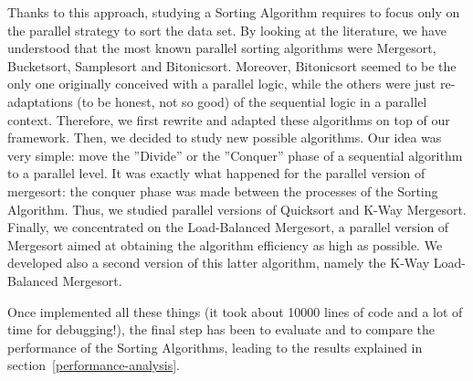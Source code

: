 Thanks to this approach, studying a Sorting Algorithm requires to focus only on the parallel strategy to sort the data set. By looking at the literature, we have understood that the most known parallel sorting algorithms were Mergesort, Bucketsort, Samplesort and Bitonicsort. Moreover, Bitonicsort seemed to be the only one originally conceived with a parallel logic, while the others were just re-adaptations (to be honest, not so good) of the sequential logic in a parallel context. Therefore, we first rewrite and adapted these algorithms on top of our framework. Then, we decided to study new possible algorithms. Our idea was very simple: move the ''Divide'' or the ''Conquer'' phase of a sequential algorithm to a parallel level. It was exactly what happened for the parallel version of mergesort: the conquer phase was made between the processes of the Sorting Algorithm. Thus, we studied parallel versions of Quicksort and K-Way Mergesort. Finally, we concentrated on the Load-Balanced Mergesort, a parallel version of Mergesort aimed at obtaining the algorithm efficiency as high as possible. We developed also a second version of this latter algorithm, namely the K-Way Load-Balanced Mergesort. 

Once implemented all these things (it took about 10000 lines of code and a lot of time for debugging!), the final step has been to evaluate and to compare the performance of the Sorting Algorithms, leading to the results explained in section~\ref{performance-analysis}. 

